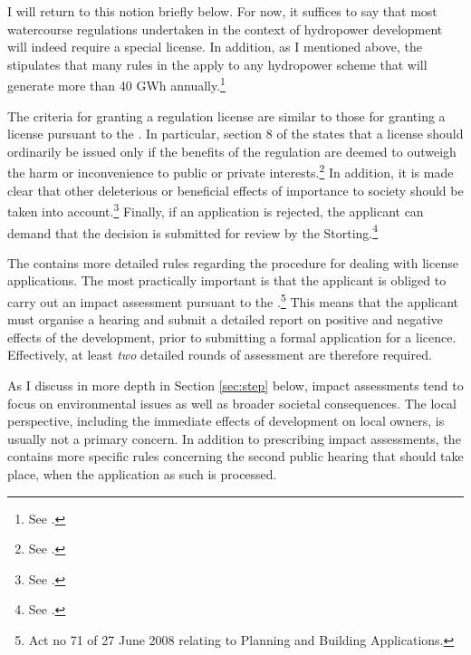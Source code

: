 I will return to this notion briefly below. For now, it suffices to say that most watercourse regulations undertaken in the context of hydropower development will indeed require a special license. In addition, as I mentioned above, the \cite{wra00} stipulates that many rules in the \cite{wra17} apply to any hydropower scheme that will generate more than 40 GWh annually.\footnote{See \cite[19]{wra00}.}

The criteria for granting a regulation license are similar to those for granting a license pursuant to the \cite{wra00}. In particular, section 8 of the \cite{wra17} states that a license should ordinarily be issued only if the benefits of the regulation are deemed to outweigh the harm or inconvenience to public or private interests.\footnote{See \cite[8]{wra17}.} In addition, it is made clear that other deleterious or beneficial effects of importance to society should be taken into account.\footnote{See \cite[8]{wra17}.} Finally, if an application is rejected, the applicant can demand that the decision is submitted for review by the Storting.\footnote{See \cite[8]{wra17}.}

The \cite{wra17} contains more detailed rules regarding the procedure for dealing with license applications. The most practically important is that the applicant is obliged to carry out an impact assessment pursuant to the \cite{pb08}.\footnote{Act no 71 of 27 June 2008 relating to Planning and Building Applications.} This means that the applicant must organise a hearing and submit a detailed report on positive and negative effects of the development, prior to submitting a formal application for a licence. Effectively, at least {\it two} detailed rounds of assessment are therefore required.

As I discuss in more depth in Section \ref{sec:step} below, impact assessments tend to focus on environmental issues as well as broader societal consequences. The local perspective, including the immediate effects of development on local owners, is usually not a primary concern. In addition to prescribing impact assessments, the \cite{wra17} contains more specific rules concerning the second public hearing that should take place, when the application as such is processed. 

